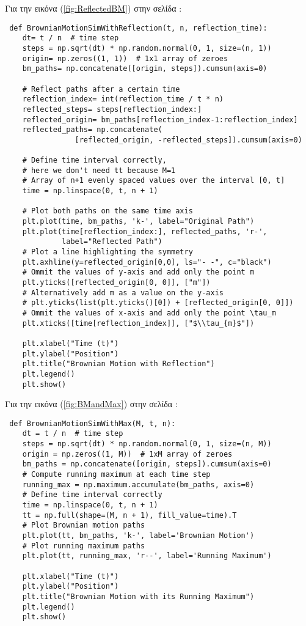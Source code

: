 \documentclass[12pt,a4paper,twoside,openany]{book}
\begin{document}
 	\vspace{4mm}
 	Για την εικόνα (\ref{fig:ReflectedBM}) στην σελίδα \pageref{fig:ReflectedBM}:
 	\vspace{4mm}
\begin{lstlisting}
 def BrownianMotionSimWithReflection(t, n, reflection_time):
 	dt= t / n  # time step
 	steps = np.sqrt(dt) * np.random.normal(0, 1, size=(n, 1))
 	origin= np.zeros((1, 1))  # 1x1 array of zeroes
 	bm_paths= np.concatenate([origin, steps]).cumsum(axis=0)
 		
 	# Reflect paths after a certain time
 	reflection_index= int(reflection_time / t * n)
 	reflected_steps= steps[reflection_index:]
 	reflected_origin= bm_paths[reflection_index-1:reflection_index]
 	reflected_paths= np.concatenate(
 			    [reflected_origin, -reflected_steps]).cumsum(axis=0)
 		
 	# Define time interval correctly, 
 	# here we don't need tt because M=1
 	# Array of n+1 evenly spaced values over the interval [0, t]
 	time = np.linspace(0, t, n + 1)  
 		
 	# Plot both paths on the same time axis
 	plt.plot(time, bm_paths, 'k-', label="Original Path")
 	plt.plot(time[reflection_index:], reflected_paths, 'r-',
 			 label="Reflected Path")
 	# Plot a line highlighting the symmetry
 	plt.axhline(y=reflected_origin[0,0], ls="- -", c="black")
 	# Ommit the values of y-axis and add only the point m 
 	plt.yticks([reflected_origin[0, 0]], ["m"])
 	# Alternatively add m as a value on the y-axis
 	# plt.yticks(list(plt.yticks()[0]) + [reflected_origin[0, 0]])
 	# Ommit the values of x-axis and add only the point \tau_m
 	plt.xticks([time[reflection_index]], ["$\\tau_{m}$"])
 		
 	plt.xlabel("Time (t)")
 	plt.ylabel("Position")
 	plt.title("Brownian Motion with Reflection")
 	plt.legend()
 	plt.show() \end{lstlisting}
 	\vspace{4mm}
 	Για την εικόνα (\ref{fig:BMandMax}) στην σελίδα \pageref{fig:BMandMax}:
 	\vspace{4mm}
\begin{lstlisting}
 def BrownianMotionSimWithMax(M, t, n):
 	dt = t / n  # time step
 	steps = np.sqrt(dt) * np.random.normal(0, 1, size=(n, M))
 	origin = np.zeros((1, M))  # 1xM array of zeroes
 	bm_paths = np.concatenate([origin, steps]).cumsum(axis=0)
 	# Compute running maximum at each time step
 	running_max = np.maximum.accumulate(bm_paths, axis=0)
 	# Define time interval correctly
 	time = np.linspace(0, t, n + 1)  
 	tt = np.full(shape=(M, n + 1), fill_value=time).T
 	# Plot Brownian motion paths
 	plt.plot(tt, bm_paths, 'k-', label='Brownian Motion')	
 	# Plot running maximum paths
 	plt.plot(tt, running_max, 'r--', label='Running Maximum')
 		
 	plt.xlabel("Time (t)")
 	plt.ylabel("Position")
 	plt.title("Brownian Motion with its Running Maximum")
 	plt.legend()
 	plt.show() \end{lstlisting}
\end{document}
